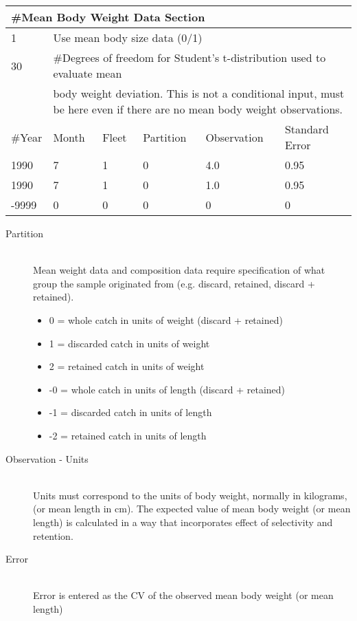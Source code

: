 \begin{center}
	\begin{tabular}{p{2cm} p{2cm} p{2cm} p{2cm} p{2cm} p{2cm}}
		\multicolumn{6}{l}{\#Mean Body Weight Data Section}\\
		\hline
		1  & \multicolumn{5}{l}{Use mean body size data (0/1) } \\
		\hline
		30 & \multicolumn{5}{l}{\#Degrees of freedom for Student's t-distribution used to evaluate mean } \\
		   & \multicolumn{5}{l}{\parbox{13cm }{ body weight deviation.  This is not a conditional input, must be here even if there are no mean body weight observations.}}\\
		\hline
		\#Year & Month & Fleet & Partition & Observation & Standard Error \\
		\hline
		1990  & 7 & 1 & 0 & 4.0 & 0.95 \\
		1990  & 7 & 1 & 0 & 1.0 & 0.95 \\
		-9999 & 0 & 0 & 0 & 0   & 0 \\
		\hline
	\end{tabular}
\end{center}

\begin{description}
	\item[Partition]\hfill\\
	Mean weight data and composition data require specification of what group the sample originated from (e.g. discard, retained, discard + retained).
	\begin{itemize}
		\item 0 = whole catch in units of weight (discard + retained)
		\item 1 = discarded catch in units of weight
		\item 2 = retained catch in units of weight
		\item -0 = whole catch in units of length (discard + retained)
		\item -1 = discarded catch in units of length
		\item -2 = retained catch in units of length
	\end{itemize}
	\item[Observation - Units]\hfill\\
	Units must correspond to the units of body weight, normally in kilograms, (or mean length in cm).  The expected value of mean body weight (or mean length) is calculated in a way that incorporates effect of selectivity and retention.
	\item[Error]\hfill\\
	Error is entered as the CV of the observed mean body weight (or mean length)
\end{description}

